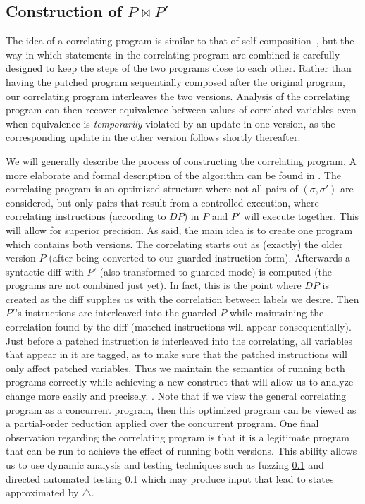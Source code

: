 \subsection{Construction of $P \bowtie P'$ }
The idea of a correlating program is similar to that of
self-composition~\cite{BartheDArgenioRezk04,AikenTerauchi05}, but the way in
which statements in the correlating program are combined is carefully designed to
keep the steps of the two programs close to each other. Rather than having
the patched program sequentially composed after the original program, our
correlating program interleaves the two versions. Analysis of the correlating program can then recover equivalence between values of correlated variables even when
equivalence is \emph{temporarily} violated by an update in one version, as
the corresponding update in the other version follows shortly thereafter.

We will generally describe the process of constructing the correlating program. A more elaborate and formal description of the algorithm can be found in . The correlating program is an optimized structure where not all pairs of $(\sigma,\sigma')$ are considered, but only pairs that result from a controlled execution, where correlating instructions (according to $DP$) in $P$ and $P'$ will execute together. This will allow for superior precision. As said, the main idea is to create one program which contains both versions. The correlating starts out as (exactly) the older version $P$ (after being converted to our guarded instruction form). Afterwards a syntactic diff with $P'$ (also transformed to guarded mode) is computed (the programs are not combined just yet). In fact, this is the point where $DP$ is created as the diff supplies us with the correlation between labels we desire. Then $P'$'s instructions are interleaved into the guarded $P$ while maintaining the correlation found by the diff (matched instructions will appear consequentially). Just before a patched instruction is interleaved into the correlating, all variables that appear in it are tagged, as to make sure that the patched instructions will only affect patched variables. Thus we maintain the semantics of running both programs correctly while achieving a new construct that will allow us to analyze change more easily and precisely. . Note that if we view the general correlating program as a concurrent program, then this optimized program can be viewed as a partial-order reduction applied over the concurrent program. One final observation regarding the correlating program is that it is a legitimate program that can be run to achieve the effect of running both versions. This ability allows us to use dynamic analysis and testing techniques such as fuzzing \ref{} and directed automated testing \ref{} which may produce input that lead to states approximated by $\triangle$.


